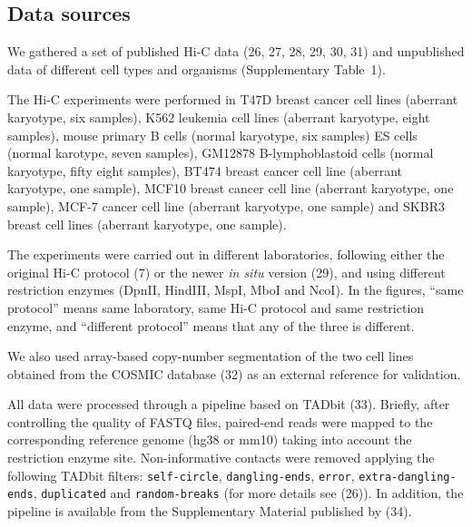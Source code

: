 \documentclass[a4,center,fleqn]{NAR}
\providecommand{\DIFadd}[1]{{\protect\color{red}#1}} %
\providecommand{\DIFdel}[1]{{\protect}}                      %
\providecommand{\DIFaddbegin}{} %
\providecommand{\DIFaddend}{} %
\providecommand{\DIFdelbegin}{} %
\providecommand{\DIFdelend}{} %
\begin{document}
\subsection{Data sources}

We gathered a set of published Hi-C data
(\DIFdelbegin \DIFdel{24, 25, }\DIFdelend 26, 27, 28\DIFaddbegin \DIFadd{, 29, 30, 31}\DIFaddend )
and unpublished data of different cell types and organisms (Supplementary
Table~1).

The Hi-C experiments were performed in T47D breast cancer cell lines
(aberrant karyotype, six samples), K562 leukemia cell lines (aberrant
karyotype, eight samples), mouse primary B cells (normal \DIFdelbegin \DIFdel{karyotyp}\DIFdelend \DIFaddbegin \DIFadd{karyotype}\DIFaddend , six
samples) ES cells (normal karotype, seven samples), GM12878
B-lymphoblastoid cells (normal karyotype, fifty eight samples), BT474
breast cancer cell line (aberrant karyotype, one sample), MCF10 breast
cancer cell line (aberrant karyotype, one sample), MCF-7 cancer cell line
(aberrant karyotype, one sample) and SKBR3 breast cell lines (aberrant
karyotype, one sample).

The experiments were carried out in different laboratories, following
either the original Hi-C protocol (7) or
the newer \textit{in situ} version (\DIFdelbegin \DIFdel{26}\DIFdelend \DIFaddbegin \DIFadd{29}\DIFaddend ), and using different
restriction enzymes (DpnII, HindIII, MspI, MboI and NcoI). In the figures,
``same protocol'' means same laboratory, same Hi-C protocol and same
restriction enzyme, and ``different protocol'' means that any of the three
is different.

We also used array-based copy-number segmentation of the two cell lines
obtained from the COSMIC database (\DIFdelbegin \DIFdel{29}\DIFdelend \DIFaddbegin \DIFadd{32}\DIFaddend ) as an external
reference for validation.


All data were processed through a pipeline based on TADbit
(\DIFdelbegin \DIFdel{30}\DIFdelend \DIFaddbegin \DIFadd{33}\DIFaddend ). Briefly, after controlling the quality of FASTQ
files, paired-end reads were mapped to the corresponding reference genome (hg38
or mm10) taking into account the restriction enzyme site.  Non-informative
contacts were removed applying the following TADbit filters:
\texttt{self-circle}, \texttt{dangling-ends}, \texttt{error},
\texttt{extra-dangling-ends}, \texttt{duplicated} and \texttt{random-breaks}
(for more details see \DIFdelbegin \DIFdel{BioRxiv:
https://doi.org/10.1101/132456)}\DIFdelend \DIFaddbegin \DIFadd{(26))}\DIFaddend . In addition, the
pipeline is available from the Supplementary Material published by
(\DIFdelbegin \DIFdel{31}\DIFdelend \DIFaddbegin \DIFadd{34}\DIFaddend ).
\end{document}
